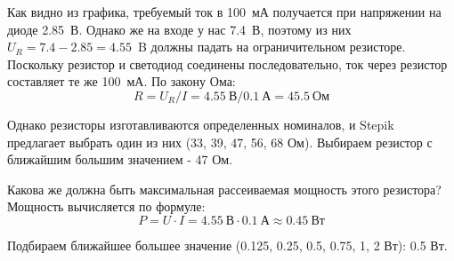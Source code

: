 Как видно из графика, требуемый ток в 100~мА получается при напряжении на диоде 2.85~В. Однако же на входе у нас 7.4~В, поэтому из них $U_R= 7.4 - 2.85 = 4.55$~B  должны падать на ограничительном резисторе. Поскольку резистор и светодиод соединены последовательно, ток через резистор составляет те же 100~мА. По закону Ома:
$$R = U_R/I = 4.55\:\text{В} / 0.1\:\text{А} = 45.5\: \text{Ом}$$

Однако резисторы изготавливаются определенных номиналов, и Stepik предлагает выбрать один из них (33, 39, 47, 56, 68 Ом).  Выбираем резистор с ближайшим большим значением - 47 Ом.  

Какова же должна быть максимальная рассеиваемая мощность этого резистора?  Мощность вычисляется по формуле:
$$P= U\cdot I = 4.55 \: \text{В} \cdot 0.1 \: \text{А} \approx 0.45 \: \text{Вт}$$

Подбираем ближайшее большее значение (0.125, 0.25, 0.5, 0.75, 1, 2 Вт):  0.5 Вт.

